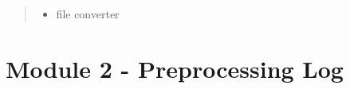 \documentclass[letterpaper,10pt,english]{sphinxmanual}
\begin{document}
\begin{fulllineitems}
\begin{fulllineitems}
\begin{quote}
\begin{description}
\begin{itemize}
\item {} 
 \textendash{} file converter

\end{itemize}

\end{description}\end{quote}

\end{fulllineitems}


\end{fulllineitems}


\begin{DUlineblock}{0em}
\item[] 
\end{DUlineblock}

{\hyperref[\detokenize{index:mastertoc}]{}}


\chapter{Module 2 - Preprocessing Log}
\label{\detokenize{preprocessing:module-2-preprocessing-log}}\label{\detokenize{preprocessing::doc}}
\begin{DUlineblock}{0em}
\item[] 
\end{DUlineblock}
\end{document}
